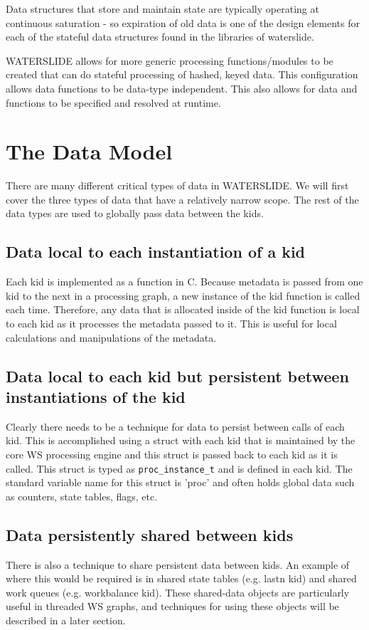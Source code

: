 \documentclass[11pt]{article}
\begin{document}
Data structures that store and maintain state are typically operating at 
continuous saturation - so expiration of old data is one of the design 
elements for each of the stateful data structures found in the libraries 
of waterslide.

WATERSLIDE allows for more generic processing functions/modules to be 
created that can do stateful processing of hashed, keyed data.  This 
configuration allows data functions to be data-type independent. This also 
allows for data and functions to be specified and resolved at runtime.

\section{The Data Model}
There are many different critical types of data in WATERSLIDE. We will first cover
the three types of data that have a relatively narrow scope. The rest of the 
data types are used to globally pass data between the kids.

\subsection{Data local to each instantiation of a kid}
Each kid is implemented as a function in C. Because metadata is passed from
one kid to the next in a processing graph, a new instance of the kid function
is called each time. Therefore, any data that is allocated inside of the kid
function is local to each kid as it processes the metadata passed to it. This
is useful for local calculations and manipulations of the metadata.

\subsection{Data local to each kid but persistent between instantiations 
of the kid}
Clearly there needs to be a technique for data to persist between calls of
each kid.  This is accomplished using a struct with each kid that is
maintained by the core WS processing engine and this struct is passed back to
each kid as it is called.  This struct is typed as \texttt{proc\_instance\_t} 
and is defined in each kid.  The standard variable name for this struct is 
'proc' and often holds global data such as counters, state tables, flags, etc.

\subsection{Data persistently shared between kids}
There is also a technique to share persistent data between kids. An example of 
where this would be required is in shared state tables (e.g. lastn kid)
and  shared work queues (e.g. workbalance kid).  These shared-data objects are 
particularly useful in  threaded WS graphs, and techniques for using these 
objects will be described in a later section.
\end{document}
